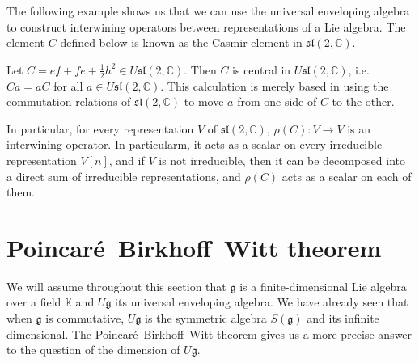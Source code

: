 \documentclass{report}
\begin{document}
The following example shows us that we can use the universal enveloping algebra to construct interwining operators between representations of a Lie algebra.
The element $C$ defined below is known as the Casmir element in $\mathfrak{sl}(2, \mathbb C)$.
\begin{example}
    Let $C = e f + f e + \frac{1}{2}h^2 \in U \mathfrak{sl}(2, \mathbb C)$.
    Then $C$ is central in $U \mathfrak{sl}(2, \mathbb C)$, i.e.\ $C a = a C $ for all $a \in U \mathfrak{sl}(2, \mathbb C)$.
    This calculation is merely based in using the commutation relations of $\mathfrak{sl}(2, \mathbb C)$ to move $a$ from one side of $C$ to the other.

    In particular, for every representation $V$ of $\mathfrak{sl}(2, \mathbb C)$, $\rho(C): V \to V$ is an interwining operator.
    In particularm, it acts as a scalar on every irreducible representation $V[n]$, and if $V$ is not irreducible, then it can be decomposed into a direct sum of irreducible representations, and $\rho(C)$ acts as a scalar on each of them.
\end{example}

\section{Poincaré--Birkhoff--Witt theorem}
We will assume throughout this section that $\mathfrak g$ is a finite-dimensional Lie algebra over a field $\mathbb K$ and $U \mathfrak g$ its universal enveloping algebra.
We have already seen that when $\mathfrak g$ is commutative, $U \mathfrak g$ is the symmetric algebra $S(\mathfrak g)$ and its infinite dimensional.
The Poincaré--Birkhoff--Witt theorem gives us a more precise answer to the question of the dimension of $U \mathfrak g$.
\end{document}
